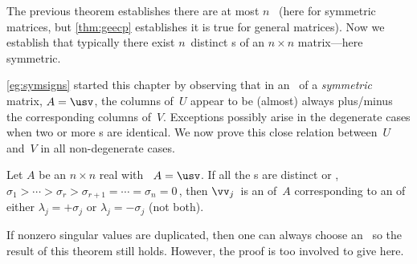 The previous theorem establishes there are at most \(n\)~ (here for symmetric matrices, but \autoref{thm:geecp} establishes it is true for general matrices).  
Now we establish that typically there exist \(n\)~distinct s of an \(n\times n\) matrix---here symmetric.

\begin{comment}
The problem case of repeated singular values and repeated eigenvalues appears to be not adequately dealt with by any first textbook that I have read.
\pooliv{p.294} discusses algebraic and geometric {multiplicity}, but best left for eigen-problem of general matrices, if necessary.
\end{comment}



\autoref{eg:symsigns} started this chapter by observing that in an \svd\ of a \emph{symmetric} matrix, \(A=\usv\), the columns of~\(U\) appear to be (almost) always plus\slash minus the corresponding columns of~\(V\).
Exceptions possibly arise in the degenerate cases when two or more s are identical.
We now prove this close relation between~\(U\) and~\(V\) in all non-degenerate cases.


\begin{theorem} \label{thm:smevec}
Let \(A\) be an \(n\times n\) real  with \svd\ \(A=\usv\).
If all the s are distinct or , \(\sigma_1>\cdots>\sigma_r>\sigma_{r+1}=\cdots=\sigma_n=0\)\,, then \(\vv_j\)~is an  of~\(A\) corresponding to an  of either \(\lambda_j=+\sigma_j\) or \(\lambda_j=-\sigma_j\) (not both).
\end{theorem}

If nonzero singular values are duplicated, then one can always choose an \svd\ so the result of this theorem still holds.
However, the proof is too involved to give here.

